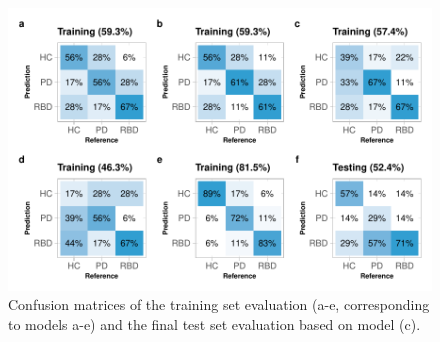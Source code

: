 \documentclass[
  english,
  doc,floatsintext]{apa6}
\begin{document}
\begin{figure}

{\centering \includegraphics{dap_report_anja_probst_files/figure-latex/multinomial-regression-1} 

}

\caption{Confusion matrices of the training set evaluation (a-e, corresponding to models a-e) and the final test set evaluation based on model (c).}\label{fig:multinomial-regression}
\end{figure}
\end{document}
